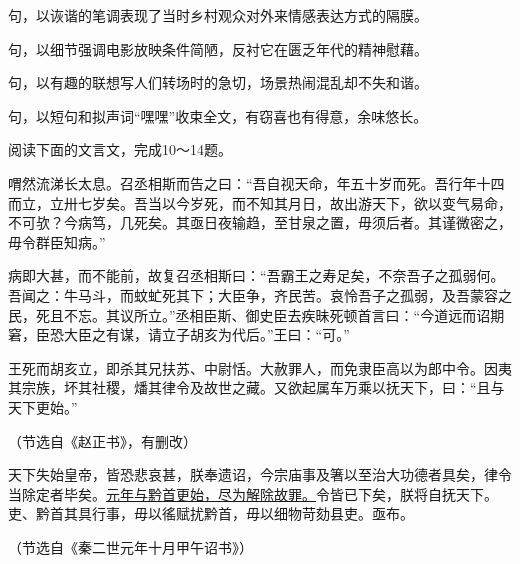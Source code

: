 \documentclass[11pt,a4paper]{ctexart}
\begin{document}
\begin{choices}
\item 句，以诙谐的笔调表现了当时乡村观众对外来情感表达方式的隔膜。
\item 句，以细节强调电影放映条件简陋，反衬它在匮乏年代的精神慰藉。
\item 句，以有趣的联想写人们转场时的急切，场景热闹混乱却不失和谐。
\item 句，以短句和拟声词“嘿嘿”收束全文，有窃喜也有得意，余味悠长。
\end{choices}


\par\vspace{2.2em}


\par\vspace{2.2em}

阅读下面的文言文，完成10～14题。

\begin{materialtext}
喟然流涕长太息。召丞相斯而告之曰：“吾自视天命，年五十岁而死。吾行年十四而立，立卅七岁矣。吾当以今岁死，而不知其月日，故出游天下，欲以变气易命，不可欤？今病笃，几死矣。其亟日夜输趋，至甘泉之置，毋须后者。其谨微密之，毋令群臣知病。”

病即大甚，而不能前，故复召丞相斯曰：“吾霸王之寿足矣，不奈吾子之孤弱何。吾闻之：牛马斗，而蚊虻死其下；大臣争，齐民苦。哀怜吾子之孤弱，及吾蒙容之民，死且不忘。其议所立。”丞相臣斯、御史臣去疾昧死顿首言曰：“今道远而诏期窘，臣恐大臣之有谋，请立子胡亥为代后。”王曰：“可。”

王死而胡亥立，即杀其兄扶苏、中尉恬。大赦罪人，而免隶臣高以为郎中令。因夷其宗族，坏其社稷，燔其律令及故世之藏。又欲起属车万乘以抚天下，曰：“且与天下更始。”
\end{materialtext}
\begin{flushright}（节选自《赵正书》，有删改）\end{flushright}

\begin{materialtext}
天下失始皇帝，皆恐悲哀甚，朕奉遗诏，今宗庙事及箸以至治大功德者具矣，律令当除定者毕矣。\uline{元年与黔首更始，尽为解除故罪。}令皆已下矣，朕将自抚天下。吏、黔首其具行事，毋以徭赋扰黔首，毋以细物苛劾县吏。亟布。
\end{materialtext}
\begin{flushright}（节选自《秦二世元年十月甲午诏书》）\end{flushright}
\end{document}
